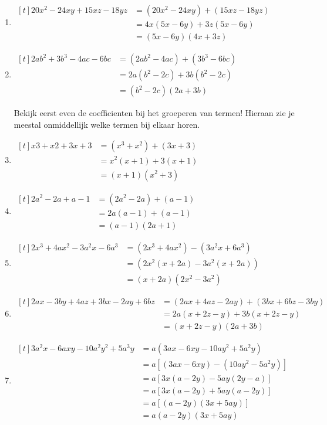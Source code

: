 \documentclass{bis}
\begin{document}
\begin{solution}
\begin{enumerate}
  \item $\begin{aligned}[t]20x^2 - 24xy + 15xz - 18yz
      &= (20x^2 - 24xy) + (15xz - 18yz)\\
			&= 4x (5x - 6y) + 3z (5x - 6y)\\
			&= (5x - 6y) (4x + 3z)
  \end{aligned}$
  \item $\begin{aligned}[t]2ab^2 + 3b^3 - 4ac - 6bc
      &= (2ab^2 - 4ac) + (3b^3 - 6bc)\\
			&= 2a (b^2 - 2c) + 3b (b^2 - 2c)\\
			&= (b^2 - 2c) (2a + 3b) \end{aligned}$
			
			Bekijk eerst even de coefficienten bij het groeperen van termen! Hieraan zie je meestal onmiddellijk welke termen bij elkaar horen.
	\item $\begin{aligned}[t]x3 + x2 + 3x + 3	
	    &= (x^3 + x^2) + (3x + 3)\\
			&= x^2 (x + 1) + 3 (x + 1)\\
			&= (x + 1) (x^2 + 3)
  \end{aligned}$
  \item $\begin{aligned}[t]2a^2 - 2a + a - 1
      &= (2a^2 - 2a) + (a - 1)\\
			&= 2a (a - 1) + (a - 1)\\
			&= (a - 1) (2a + 1)
  \end{aligned}$
  \item $\begin{aligned}[t]2x^3 + 4ax^2 - 3a^2x - 6a^3
      &= (2x^3 + 4ax^2) - (3a^2x + 6a^3)\\
			&= (2x^2 (x + 2a) - 3a^2 (x + 2a))\\
			&= (x + 2a) (2x^2 - 3a^2)
  \end{aligned}$
  \item $\begin{aligned}[t]2ax - 3by + 4az + 3bx - 2ay + 6bz
    &= (2ax + 4az - 2ay) + (3bx + 6bz - 3by)\\
		&= 2a (x + 2z - y) + 3b (x + 2z - y)\\
		&= (x + 2z - y) (2a + 3b)
  \end{aligned}$
  \item $\begin{aligned}[t]3a^2x - 6axy - 10a^2y^2 + 5a^3y
    &= a (3ax - 6xy - 10ay^2 + 5a^2y)\\
		&= a [(3ax - 6xy) - (10ay^2 - 5a^2y)]\\
		&= a [3x (a - 2y) - 5ay (2y - a)]\\
		&= a [3x (a - 2y) + 5ay (a - 2y)]\\
		&= a [(a - 2y) (3x + 5ay)]\\
		&= a (a - 2y) (3x + 5ay)
  \end{aligned}$
		

\end{enumerate}
\end{solution}
\end{document}
